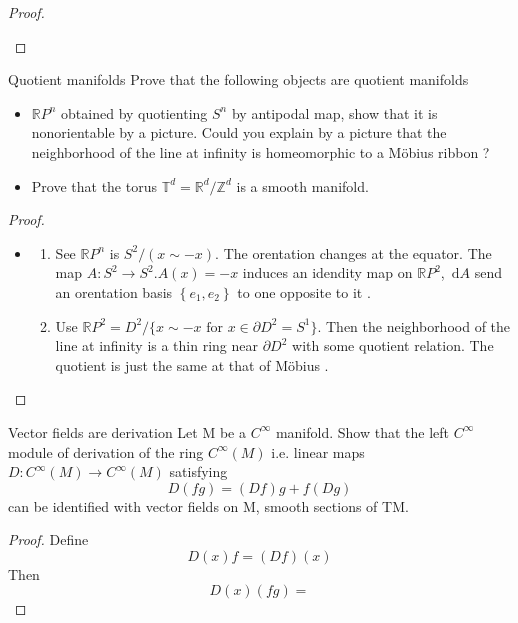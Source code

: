 \documentclass[../main.tex]{subfiles}
\begin{document}
\begin{proof}
\begin{itemize}
 \end{itemize}
  
\end{proof}
\begin{exercise}{Quotient manifolds}{}
Prove that the following objects are quotient manifolds
\begin{itemize}
    \item $\mathbb{R}P^n$ obtained by quotienting $S^n$ by antipodal map, show that it is nonorientable by a picture. Could you explain by a picture that the neighborhood of the line at infinity is homeomorphic to a Möbius ribbon ?
    \item Prove that the torus $\mathbb{T}^d = \mathbb{R}^d/\mathbb{Z}^d$ is a smooth manifold.
\end{itemize}
\end{exercise}
\begin{proof}

    
    \begin{itemize}


        \item 
        \begin{enumerate}
            \item See \(  \mathbb{R} P^{n}  \) is \(  S^{2}  /\left( x\sim -x \right) \).  The orentation changes at the equator.    The map \(  A: S^{2}\to S^{2} . A\left( x \right)= -x   \) induces an idendity map on \(  \mathbb{R} P^{2}  \), \(  \,\mathrm{d} A  \) send an orentation basis \(  \left\{ e_1,e_2 \right\}  \) to one opposite to it .  
            \item Use $\mathbb{R}P^2 = D^2 / \{x \sim -x \text{ for } x \in \partial D^2 = S^1\}$. Then the neighborhood of the line at infinity is a thin ring near \(   \partial D^{2}  \) with some quotient relation. The quotient is just the same at that of Möbius .
        \end{enumerate}
        
    \end{itemize}
    
\end{proof}
\begin{exercise}{Vector fields are derivation}{}
Let M be a $C^\infty$ manifold. Show that the left $C^\infty$ module of derivation of the ring $C^\infty(M)$ i.e. linear maps $D: C^\infty(M) \to C^\infty(M)$ satisfying
\[ D(fg) = (Df)g + f(Dg) \]
can be identified with vector fields on M, smooth sections of TM.
\end{exercise}
\begin{proof}
    
    Define \[
    D\left( x \right)f=  \left( Df \right)\left( x \right)        
    \] Then \[
    D\left( x \right)\left( fg \right)=   
    \]
\end{proof}
\end{document}
